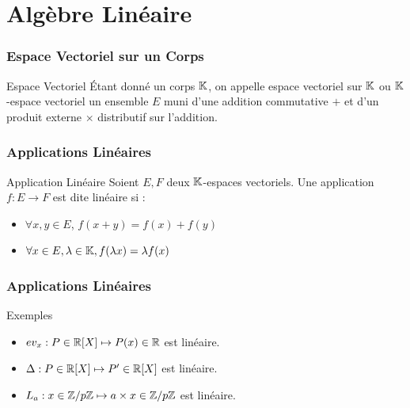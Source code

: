 \documentclass{beamercours}
\begin{document}
\section{Algèbre Linéaire}
\begin{frame}
\frametitle{Espace Vectoriel sur un Corps}
\begin{définition}{Espace Vectoriel}{}
Étant donné un corps $\mathbb{K}$, on appelle espace vectoriel sur $\mathbb{K}$ ou $\mathbb{K}$-espace vectoriel un ensemble $E$ muni d'une addition commutative $+$ et d'un produit externe $\times$ distributif sur l'addition.
\end{définition}
\end{frame}

\begin{frame}
\frametitle{Applications Linéaires}
\begin{définition}{Application Linéaire}{}
Soient $E, F$ deux $\mathbb{K}$-espaces vectoriels. Une application $f : E \to F$ est dite linéaire si :
\begin{itemize}
    \item $\forall x, y \in E$, $f(x + y) = f(x) + f(y)$
    \item $\forall x \in E, \lambda \in \mathbb{K}, f(\lambda x) = \lambda f(x)$
\end{itemize}
\end{définition}
\end{frame}


\begin{frame}
    \frametitle{Applications Linéaires}
    \begin{propositionfr}{Exemples}{}
        \begin{itemize}[<+->]
            \item $ev_{x} : P \in \mathbb{R}[X] \mapsto P(x) \in \mathbb{R}$ est linéaire.
            \item $\Delta : P \in \mathbb{R}[X] \mapsto P' \in \mathbb{R}[X]$ est linéaire.
            \item $L_{a} : x \in \mathbb{Z}/p\mathbb{Z} \mapsto a \times x \in \mathbb{Z}/p\mathbb{Z}$ est linéaire.
        \end{itemize}
    \end{propositionfr}
\end{frame}
\end{document}
